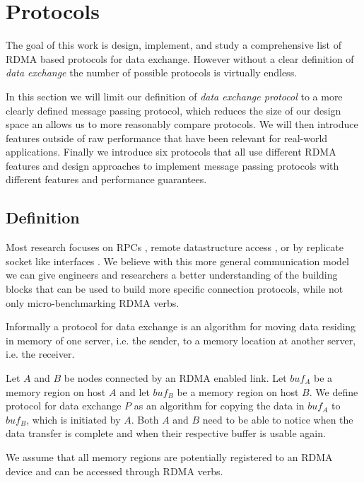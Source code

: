 \section{Protocols}\label{sec:protocols}
The goal of this work is design, implement, and study a comprehensive list of RDMA based protocols for data exchange. 
However without a clear definition of \emph{data exchange} the number of possible protocols is virtually endless.

In this section we will limit our definition of \emph{data exchange protocol} to a more clearly defined message passing
protocol, which reduces the size of our design space an allows us to more reasonably compare protocols. We will then introduce
features outside of raw performance that have been relevant for real-world applications. Finally we introduce six 
protocols that all use different RDMA features and design approaches to implement message passing protocols with different 
features and performance guarantees.

\subsection{Definition}\label{sec:proto-def}

Most research focuses on RPCs \cite{herd, guidlines}, remote datastructure access \cite{pilaf, others}, or by replicate 
socket like interfaces \cite{SocksDirect}. We believe with this more general
communication model we can give engineers and researchers a better understanding of the building blocks that can be 
used to build more specific connection protocols, while not only micro-benchmarking RDMA verbs.



Informally a protocol for data exchange is an algorithm for moving data residing in memory of one server, i.e. the sender, to 
a memory location at another server, i.e. the receiver.

\begin{defn}
Let $A$ and $B$ be nodes connected by an RDMA enabled link. Let $buf_A$ be a memory region on host $A$ and let $buf_B$ 
be a memory region on host $B$. We define protocol for data exchange $P$ as an algorithm for copying the
data in $buf_A$ to $buf_B$, which is initiated by $A$. Both $A$ and $B$ need to be able to notice when the data transfer
is complete and when their respective buffer is usable again.
\end{defn}

\begin{rem}
  We assume that all memory regions are potentially registered to an RDMA device and can be accessed through RDMA verbs.
\end{rem}

